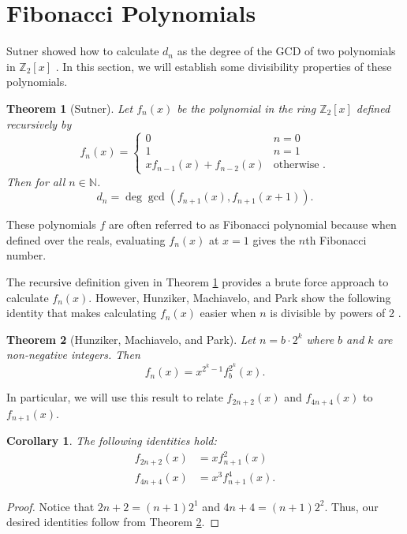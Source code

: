 \documentclass[a4paper]{article}
\newtheorem{theorem}{Theorem}[section]
\newtheorem{corollary}{Corollary}[theorem]
\newcommand{\Z}{\mathbb{Z}}
\newcommand{\N}{\mathbb{N}}
\begin{document}
	\section{Fibonacci Polynomials}
	Sutner showed how to calculate $d_n$ as the degree of the GCD of two polynomials in $\Z_2[x]$ \cite{Sutner96sigma-automataand}.
	In this section, we will establish some divisibility properties of these polynomials.
	
	\begin{theorem}[Sutner]\label{Sutner_gcd}
		Let $f_n(x)$ be the polynomial in the ring $\Z_2[x]$ defined recursively by
		\begin{equation*}
			f_n(x) = \begin{cases}
				0 & n=0 \\
				1 & n=1 \\
				xf_{n-1}(x) + f_{n-2}(x) & \text{otherwise }.
			\end{cases}
		\end{equation*}
		Then for all $n \in \N$.
		\begin{equation*}
			d_n = \deg{\gcd\left(f_{n+1}(x), f_{n+1}(x+1)\right)}.
		\end{equation*}
	\end{theorem}
	These polynomials $f$ are often referred to as Fibonacci polynomial because when defined over the reals, evaluating $f_n(x)$ at $x=1$ gives the $n$th Fibonacci number.

	The recursive definition given in Theorem \ref{Sutner_gcd} provides a brute force approach to calculate $f_n(x)$.
	However, Hunziker, Machiavelo, and Park show the following identity that makes calculating $f_n(x)$ easier when $n$ is divisible by powers of 2 \cite{HUNZIKER2004465}.
	
	\begin{theorem}[Hunziker, Machiavelo, and Park]\label{HMP_identity}
		Let $n = b\cdot2^{k}$ where $b$ and $k$ are non-negative integers.
		Then
		\begin{equation*}
			f_n(x) = x^{2^{k}-1} f_{b}^{2^{k}}(x).
		\end{equation*}
	\end{theorem}

	In particular, we will use this result to relate $f_{2n+2}(x)$ and $f_{4n+4}(x)$ to $f_{n+1}(x)$.
	\begin{corollary}\label{cor1}
		The following identities hold:
		\begin{align*}
			f_{2n+2}(x) &= xf_{n+1}^2(x) \\
			f_{4n+4}(x) &= x^3f_{n+1}^4(x).
		\end{align*}
	\end{corollary}
	\begin{proof}
		Notice that $2n+2 = (n+1)2^1$ and $4n+4 = (n+1)2^{2}$.
		Thus, our desired identities follow from Theorem \ref{HMP_identity}.
	\end{proof}
\end{document}
